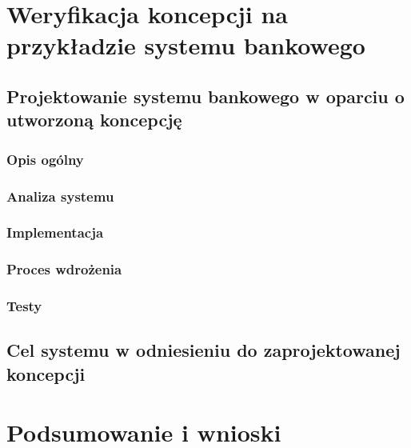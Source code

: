 \chapter{Weryfikacja koncepcji na przykładzie systemu bankowego}
\section{Projektowanie systemu bankowego w oparciu o utworzoną koncepcję}
\subsection{Opis ogólny}
\subsection{Analiza systemu}
\subsection{Implementacja}
\subsection{Proces wdrożenia}
\subsection{Testy}
\section{Cel systemu w odniesieniu do zaprojektowanej koncepcji}
\chapter{Podsumowanie i wnioski}
